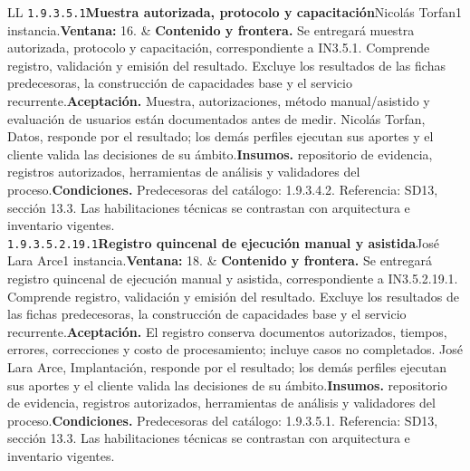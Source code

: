 \begin{longtable}{L{\tabcolsep\relax}L{\tabcolsep\relax}}
\texttt{1.\allowbreak{}9.\allowbreak{}3.\allowbreak{}5.\allowbreak{}1}\newline{}\textbf{Muestra autorizada, protocolo y capacitación}\newline{}Nicolás Torfan\newline{}1 instancia.\newline{}\textbf{Ventana:} 16. & \textbf{Contenido y frontera.} Se entregará muestra autorizada, protocolo y capacitación, correspondiente a IN3.5.1. Comprende registro, validación y emisión del resultado. Excluye los resultados de las fichas predecesoras, la construcción de capacidades base y el servicio recurrente.\newline{}\textbf{Aceptación.} Muestra, autorizaciones, método manual/asistido y evaluación de usuarios están documentados antes de medir. Nicolás Torfan, Datos, responde por el resultado; los demás perfiles ejecutan sus aportes y el cliente valida las decisiones de su ámbito.\newline{}\textbf{Insumos.} repositorio de evidencia, registros autorizados, herramientas de análisis y validadores del proceso.\newline{}\textbf{Condiciones.} Predecesoras del catálogo: 1.9.3.4.2. Referencia: SD13, sección 13.3. Las habilitaciones técnicas se contrastan con arquitectura e inventario vigentes.\\\hline
\texttt{1.\allowbreak{}9.\allowbreak{}3.\allowbreak{}5.\allowbreak{}2.\allowbreak{}19.\allowbreak{}1}\newline{}\textbf{Registro quincenal de ejecución manual y asistida}\newline{}José Lara Arce\newline{}1 instancia.\newline{}\textbf{Ventana:} 18. & \textbf{Contenido y frontera.} Se entregará registro quincenal de ejecución manual y asistida, correspondiente a IN3.5.2.19.1. Comprende registro, validación y emisión del resultado. Excluye los resultados de las fichas predecesoras, la construcción de capacidades base y el servicio recurrente.\newline{}\textbf{Aceptación.} El registro conserva documentos autorizados, tiempos, errores, correcciones y costo de procesamiento; incluye casos no completados. José Lara Arce, Implantación, responde por el resultado; los demás perfiles ejecutan sus aportes y el cliente valida las decisiones de su ámbito.\newline{}\textbf{Insumos.} repositorio de evidencia, registros autorizados, herramientas de análisis y validadores del proceso.\newline{}\textbf{Condiciones.} Predecesoras del catálogo: 1.9.3.5.1. Referencia: SD13, sección 13.3. Las habilitaciones técnicas se contrastan con arquitectura e inventario vigentes.\\\hline

\end{longtable}
